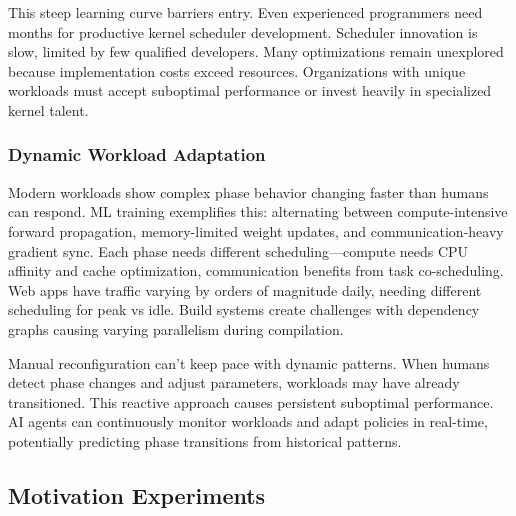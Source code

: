 This steep learning curve barriers entry. Even experienced programmers need months for productive kernel scheduler development. Scheduler innovation is slow, limited by few qualified developers. Many optimizations remain unexplored because implementation costs exceed resources. Organizations with unique workloads must accept suboptimal performance or invest heavily in specialized kernel talent.

\subsubsection{Dynamic Workload Adaptation}

Modern workloads show complex phase behavior changing faster than humans can respond. ML training exemplifies this: alternating between compute-intensive forward propagation, memory-limited weight updates, and communication-heavy gradient sync. Each phase needs different scheduling—compute needs CPU affinity and cache optimization, communication benefits from task co-scheduling. Web apps have traffic varying by orders of magnitude daily, needing different scheduling for peak vs idle. Build systems create challenges with dependency graphs causing varying parallelism during compilation.

Manual reconfiguration can't keep pace with dynamic patterns. When humans detect phase changes and adjust parameters, workloads may have already transitioned. This reactive approach causes persistent suboptimal performance. AI agents can continuously monitor workloads and adapt policies in real-time, potentially predicting phase transitions from historical patterns.

\subsection{Motivation Experiments}

